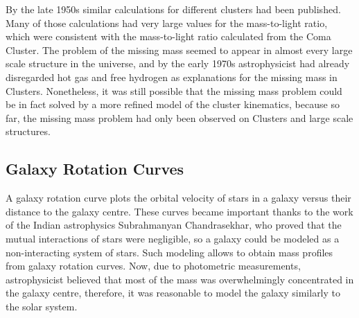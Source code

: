 By the late 1950s similar calculations for different clusters had been published. Many of those calculations had very large values for the mass-to-light ratio\cite{schwarzschildSon}, which were consistent with the mass-to-light ratio calculated from the Coma Cluster. The problem of the missing mass seemed to appear in almost every large scale structure in the universe, and by the early 1970s astrophysicist had already disregarded hot gas\cite{meekins} and free hydrogen\cite{penzias} as explanations for the missing mass in Clusters. Nonetheless, it was still possible that the missing mass problem could be in fact solved by a more refined model of the cluster kinematics, because so far, the missing mass problem had only been observed on Clusters and large scale structures.

\subsection{Galaxy Rotation Curves}
A galaxy rotation curve plots the orbital velocity of stars in a galaxy versus their distance to the galaxy centre.
These curves became important thanks to the work of the Indian astrophysics Subrahmanyan Chandrasekhar, who proved that the mutual interactions of stars were negligible, so a galaxy could be modeled as a non-interacting system of stars. Such modeling allows to obtain mass profiles from galaxy rotation curves.
Now, due to photometric measurements, astrophysicist believed that most of the mass was overwhelmingly concentrated  in the galaxy centre, therefore, it was reasonable to model the galaxy similarly to the solar system.

